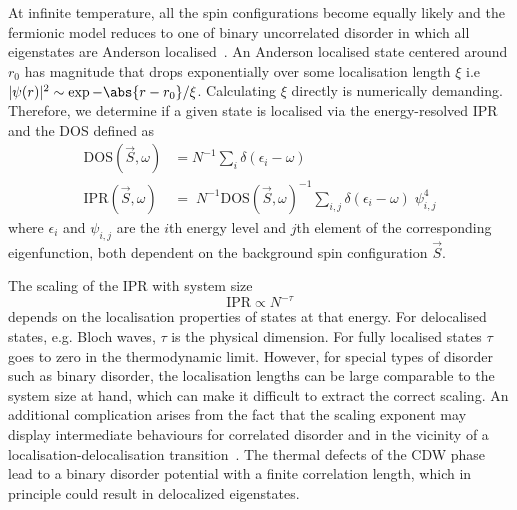 At infinite temperature, all the spin configurations become equally likely and the fermionic model reduces to one of binary uncorrelated disorder in which all eigenstates are Anderson localised~\cite{abrahamsScalingTheoryLocalization1979}. An Anderson localised state centered around \(r_0\) has magnitude that drops exponentially over some localisation length \(\xi\) i.e \(|\psi(r)|^2 \sim \exp{-\abs{r - r_0}/\xi}\). Calculating $\xi$ directly is numerically demanding. Therefore, we determine if a given state is localised via the energy-resolved \ac{IPR} and the \ac{DOS} defined as
\begin{align}
\mathrm{DOS}(\vec{S}, \omega)& = N^{-1} \sum_{i} \delta(\epsilon_i - \omega)\\
\mathrm{IPR}(\vec{S}, \omega)& = \; N^{-1} \mathrm{DOS}(\vec{S}, \omega)^{-1} \sum_{i,j} \delta(\epsilon_i - \omega)\;\psi^{4}_{i,j}
\end{align}
where \(\epsilon_i\) and \(\psi_{i,j}\) are the \(i\)th energy level and \(j\)th element of the corresponding eigenfunction, both dependent on the background spin configuration \(\vec{S}\). 

The scaling of the IPR with system size
\[\mathrm{IPR} \propto N^{-\tau}\]
depends on the localisation properties of states at that energy. For delocalised states, e.g. Bloch waves, \(\tau\) is the physical dimension. For fully localised states \(\tau\) goes to zero in the thermodynamic limit. However, for special types of disorder such as binary disorder, the localisation lengths can be large comparable to the system size at hand, which can make it difficult to extract the correct scaling. An additional complication arises from the fact that the scaling exponent may display intermediate behaviours for correlated disorder and in the vicinity of a localisation-delocalisation transition~\cite{kramerLocalizationTheoryExperiment1993, eversAndersonTransitions2008a}. The thermal defects of the CDW phase lead to a binary disorder potential with a finite correlation length, which in principle could result in delocalized eigenstates.  

